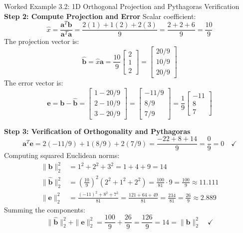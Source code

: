 \begin{examplebox}{Worked Example 3.2: 1D Orthogonal Projection and Pythagoras Verification}
\textbf{Step 2: Compute Projection and Error}
Scalar coefficient:
\begin{equation*}
\hat{x} = \frac{\mathbf{a}^T \mathbf{b}}{\mathbf{a}^T \mathbf{a}} = \frac{2(1) + 1(2) + 2(3)}{9} = \frac{2 + 2 + 6}{9} = \frac{10}{9}
\end{equation*}
The projection vector is:
\begin{equation*}
\hat{\mathbf{b}} = \hat{x}\mathbf{a} = \frac{10}{9} \begin{bmatrix} 2 \\ 1 \\ 2 \end{bmatrix} = \begin{bmatrix} 20/9 \\ 10/9 \\ 20/9 \end{bmatrix}
\end{equation*}
The error vector is:
\begin{equation*}
\mathbf{e} = \mathbf{b} - \hat{\mathbf{b}} = \begin{bmatrix} 1 - 20/9 \\ 2 - 10/9 \\ 3 - 20/9 \end{bmatrix} = \begin{bmatrix} -11/9 \\ 8/9 \\ 7/9 \end{bmatrix} = \frac{1}{9} \begin{bmatrix} -11 \\ 8 \\ 7 \end{bmatrix}
\end{equation*}

\textbf{Step 3: Verification of Orthogonality and Pythagoras}
\begin{equation*}
\mathbf{a}^T \mathbf{e} = 2(-11/9) + 1(8/9) + 2(7/9) = \frac{-22 + 8 + 14}{9} = \frac{0}{9} = 0 \quad \checkmark
\end{equation*}
Computing squared Euclidean norms:
\begin{align*}
\|\mathbf{b}\|_2^2 &= 1^2 + 2^2 + 3^2 = 1 + 4 + 9 = 14 \\
\|\hat{\mathbf{b}}\|_2^2 &= \left(\frac{10}{9}\right)^2 (2^2 + 1^2 + 2^2) = \frac{100}{81} \cdot 9 = \frac{100}{9} \approx 11.111 \\
\|\mathbf{e}\|_2^2 &= \frac{(-11)^2 + 8^2 + 7^2}{81} = \frac{121 + 64 + 49}{81} = \frac{234}{81} = \frac{26}{9} \approx 2.889
\end{align*}
Summing the components:
\begin{equation*}
\|\hat{\mathbf{b}}\|_2^2 + \|\mathbf{e}\|_2^2 = \frac{100}{9} + \frac{26}{9} = \frac{126}{9} = 14 = \|\mathbf{b}\|_2^2 \quad \checkmark
\end{equation*}
\end{examplebox}

